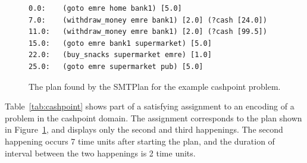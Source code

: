 \begin{figure}[thb]
\small
\begin{verbatim}
0.0:	(goto emre home bank1) [5.0]
7.0:	(withdraw_money emre bank1) [2.0] (?cash [24.0])
11.0:	(withdraw_money emre bank1) [2.0] (?cash [99.5])
15.0:	(goto emre bank1 supermarket) [5.0]
22.0:	(buy_snacks supermarket emre) [1.0]
25.0:	(goto emre supermarket pub) [5.0]
\end{verbatim}
\caption{The plan found by the SMTPlan for the example cashpoint problem.}
\label{fig:cashpoint plan}
\end{figure}

Table~\ref{tab:cashpoint} shows part of a satisfying assignment to an encoding of a problem in the cashpoint domain. The assignment corresponds to the plan shown in Figure~\ref{fig:cashpoint plan}, and displays only the second and third happenings. The second happening occurs 7 time units after starting the plan, and the duration of interval between the two happenings is 2 time units.

